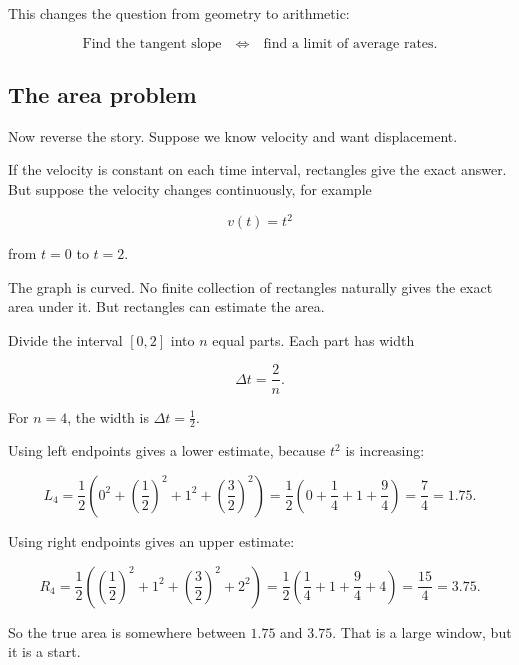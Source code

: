 This changes the question from geometry to arithmetic:

\[
\boxed{
\text{Find the tangent slope}
\quad
\Longleftrightarrow
\quad
\text{find a limit of average rates.}
}
\]

\subsection{The area problem}

Now reverse the story. Suppose we know velocity and want displacement.

If the velocity is constant on each time interval, rectangles give the exact answer. But suppose the velocity changes continuously, for example

\[
v(t)=t^2
\]

from \(t=0\) to \(t=2\).

The graph is curved. No finite collection of rectangles naturally gives the exact area under it. But rectangles can estimate the area.

Divide the interval \([0,2]\) into \(n\) equal parts. Each part has width

\[
\Delta t=\frac{2}{n}.
\]

For \(n=4\), the width is \(\Delta t=\frac12\).

Using left endpoints gives a lower estimate, because \(t^2\) is increasing:

\[
L_4
=
\frac12\left(0^2+\left(\frac12\right)^2+1^2+\left(\frac32\right)^2\right)
=
\frac12\left(0+\frac14+1+\frac94\right)
=
\frac74
=
1.75.
\]

Using right endpoints gives an upper estimate:

\[
R_4
=
\frac12\left(\left(\frac12\right)^2+1^2+\left(\frac32\right)^2+2^2\right)
=
\frac12\left(\frac14+1+\frac94+4\right)
=
\frac{15}{4}
=
3.75.
\]

So the true area is somewhere between \(1.75\) and \(3.75\). That is a large window, but it is a start.

